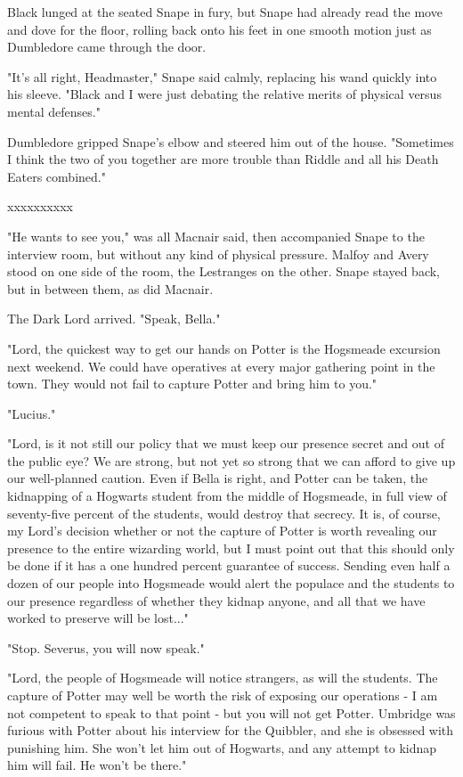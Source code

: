 \documentclass[a4paper,11pt]{article}
\begin{document}
Black lunged at the seated Snape in fury, but Snape had already read the move and dove for the floor, rolling back onto his feet in one smooth motion just as Dumbledore came through the door.

"It's all right, Headmaster," Snape said calmly, replacing his wand quickly into his sleeve. "Black and I were just debating the relative merits of physical versus mental defenses."

Dumbledore gripped Snape's elbow and steered him out of the house. "Sometimes I think the two of you together are more trouble than Riddle and all his Death Eaters combined."

xxxxxxxxxx

"He wants to see you," was all Macnair said, then accompanied Snape to the interview room, but without any kind of physical pressure. Malfoy and Avery stood on one side of the room, the Lestranges on the other. Snape stayed back, but in between them, as did Macnair.

The Dark Lord arrived. "Speak, Bella."

"Lord, the quickest way to get our hands on Potter is the Hogsmeade excursion next weekend. We could have operatives at every major gathering point in the town. They would not fail to capture Potter and bring him to you."

"Lucius."

"Lord, is it not still our policy that we must keep our presence secret and out of the public eye? We are strong, but not yet so strong that we can afford to give up our well-planned caution. Even if Bella is right, and Potter can be taken, the kidnapping of a Hogwarts student from the middle of Hogsmeade, in full view of seventy-five percent of the students, would destroy that secrecy. It is, of course, my Lord's decision whether or not the capture of Potter is worth revealing our presence to the entire wizarding world, but I must point out that this should only be done if it has a one hundred percent guarantee of success. Sending even half a dozen of our people into Hogsmeade would alert the populace and the students to our presence regardless of whether they kidnap anyone, and all that we have worked to preserve will be lost..."

"Stop. Severus, you will now speak."

"Lord, the people of Hogsmeade will notice strangers, as will the students. The capture of Potter may well be worth the risk of exposing our operations - I am not competent to speak to that point - but you will not get Potter. Umbridge was furious with Potter about his interview for the Quibbler, and she is obsessed with punishing him. She won't let him out of Hogwarts, and any attempt to kidnap him will fail. He won't be there."
\end{document}
